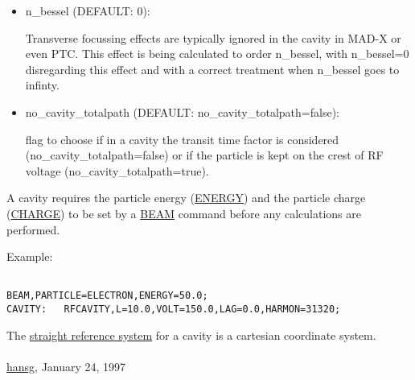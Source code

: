 \begin{itemize}
	\item n\_bessel (DEFAULT: 0): 

 Transverse focussing effects are typically ignored in the cavity in MAD-X or even PTC. This effect is being calculated to order n\_bessel, with n\_bessel=0 disregarding this effect and with a correct treatment when n\_bessel goes to infinty. 
	\item no\_cavity\_totalpath (DEFAULT: no\_cavity\_totalpath=false):

 flag to choose if in a cavity the transit time factor is considered (no\_cavity\_totalpath=false) or if the particle is kept on the crest of RF voltage (no\_cavity\_totalpath=true). 
\end{itemize}  A cavity requires the particle energy (\href{beam.html#energy}{ENERGY}) and the particle charge (\href{beam.html#charge}{CHARGE}) to be set by a \href{beam.html}{BEAM} command before any calculations are performed. 

 Example: 
\begin{verbatim}

BEAM,PARTICLE=ELECTRON,ENERGY=50.0;
CAVITY:   RFCAVITY,L=10.0,VOLT=150.0,LAG=0.0,HARMON=31320;
\end{verbatim} The \href{local_system.html#straight}{straight reference system} for a cavity is a cartesian coordinate system. 
\\
\\
\href{http://www.cern.ch/Hans.Grote/hansg_sign.html}{hansg}, January 24, 1997 


